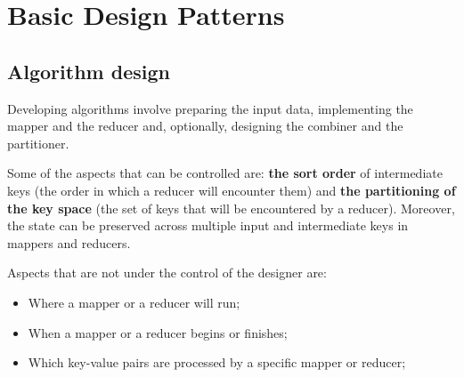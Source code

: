 \section {Basic Design Patterns}
\subsection{Algorithm design}
Developing algorithms involve preparing the input data, implementing the mapper and the reducer and, optionally, designing the combiner and the partitioner.
\par
Some of the aspects that can be controlled are: \textbf{the sort order} of intermediate keys (the order in which a reducer will encounter them) and \textbf{the partitioning of the key space} (the set of keys that will be encountered by a reducer). Moreover, the state can be preserved across multiple input and intermediate keys in mappers and reducers.
\par
Aspects that are not under the control of the designer are:
\begin{itemize}
	\item Where a mapper or a reducer will run;
	\item When a mapper or a reducer begins or finishes;
	\item Which key-value pairs are processed by a specific mapper or reducer;
\end{itemize}

